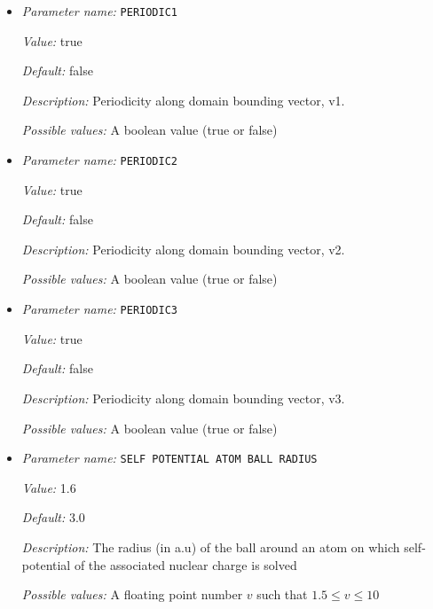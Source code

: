 \begin{itemize}
\item {\it Parameter name:} {\tt PERIODIC1}
\label{parameters:Boundary conditions/PERIODIC1}
\label{parameters:Boundary_20conditions/PERIODIC1}


{\it Value:} true


{\it Default:} false


{\it Description:} Periodicity along domain bounding vector, v1.


{\it Possible values:} A boolean value (true or false)
\item {\it Parameter name:} {\tt PERIODIC2}
\label{parameters:Boundary conditions/PERIODIC2}
\label{parameters:Boundary_20conditions/PERIODIC2}


{\it Value:} true


{\it Default:} false


{\it Description:} Periodicity along domain bounding vector, v2.


{\it Possible values:} A boolean value (true or false)
\item {\it Parameter name:} {\tt PERIODIC3}
\label{parameters:Boundary conditions/PERIODIC3}
\label{parameters:Boundary_20conditions/PERIODIC3}


{\it Value:} true


{\it Default:} false


{\it Description:} Periodicity along domain bounding vector, v3.


{\it Possible values:} A boolean value (true or false)
\item {\it Parameter name:} {\tt SELF POTENTIAL ATOM BALL RADIUS}
\label{parameters:Boundary conditions/SELF POTENTIAL ATOM BALL RADIUS}
\label{parameters:Boundary_20conditions/SELF_20POTENTIAL_20ATOM_20BALL_20RADIUS}


{\it Value:} 1.6


{\it Default:} 3.0


{\it Description:} The radius (in a.u) of the ball around an atom on which self-potential of the associated nuclear charge is solved


{\it Possible values:} A floating point number $v$ such that $1.5 \leq v \leq 10$
\end{itemize}

